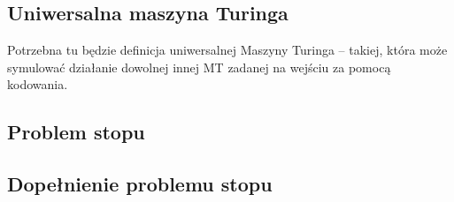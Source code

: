 \subsection{Uniwersalna maszyna Turinga}
Potrzebna tu będzie definicja uniwersalnej Maszyny Turinga -- takiej, która może symulować działanie dowolnej innej MT zadanej na wejściu za pomocą kodowania. 



\subsection{Problem stopu}
\label{lhp}


\subsection{Dopełnienie problemu stopu} 
